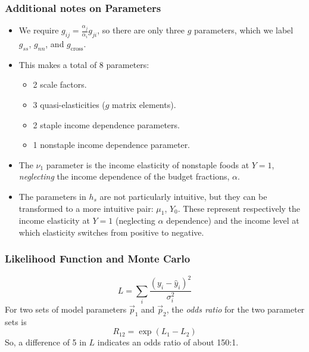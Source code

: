 \documentclass{beamer}
\begin{document}
\begin{frame}
  \frametitle{Additional notes on Parameters}
  \begin{itemize}
    \item We require $g_{ij} = \frac{\alpha_j}{\alpha_i}g_{ji}$, so there are only three $g$
      parameters, which we label $g_{ss}$, $g_{nn}$, and
      $g_{\text{cross}}$.
    \item This makes a total of 8 parameters:
      \begin{itemize}
      \item 2 scale factors.
      \item 3 quasi-elasticities ($g$ matrix elements).
      \item 2 staple income dependence parameters.
      \item 1 nonstaple income dependence parameter.
      \end{itemize}
    \item The $\nu_1$ parameter is the income elasticity of nonstaple
      foods at $Y=1$, \emph{neglecting} the income dependence of the
      budget fractions, $\alpha$.
    \item The parameters in $h_s$ are not particularly intuitive, but
      they can be transformed to a more intuitive pair: $\mu_1$,
      $Y_0$.  These represent respectively the income elasticity at
      $Y=1$ (neglecting $\alpha$ dependence) and the income level at
      which elasticity switches from positive to negative.
  \end{itemize}
\end{frame}

\begin{frame}
  \frametitle{Likelihood Function and Monte Carlo}
  \begin{equation}
    L = \sum_i \frac{(y_i - \hat{y}_i)^2}{\sigma_i^2}
  \end{equation}
  For two sets of model parameters $\vec{p}_1$ and $\vec{p}_2$, the
  \emph{odds ratio} for the two parameter sets is
  \begin{equation}
    R_{12} = \exp\left(L_1 - L_2\right)
  \end{equation}
  So, a difference of 5 in $L$ indicates an odds ratio of about 150:1.
\end{frame}
\end{document}
